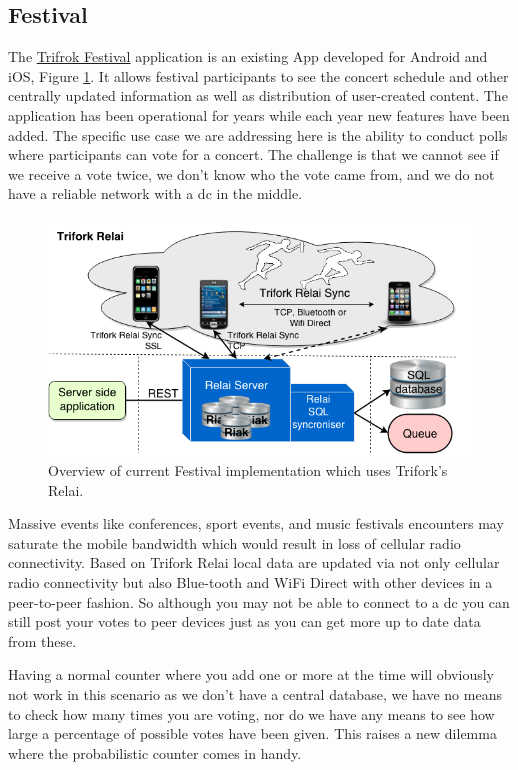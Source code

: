 \subsection{Festival}
The \href{https://www.trifork.com/news/roskilde-festival}{Trifrok Festival} application is an existing App developed for Android and iOS, Figure \ref{fig:relai_layout}. It allows festival participants to see the concert schedule and other centrally updated information as well as distribution of user-created content. The application has been operational for years while each year new features have been added. The specific use case we are addressing here is the ability to conduct polls where participants can vote for a concert. The challenge is that we cannot see if we receive a vote twice, we don't know who the vote came from, and we do not have a reliable network with a \gls{dc} in the middle.
\begin{figure}[!ht]
	\centering
	\includegraphics[width=1\textwidth]{figures/TriforkRelai.png}
	
	\caption{Overview of current Festival implementation which uses Trifork's Relai.}
	\label{fig:relai_layout}
\end{figure}

Massive events like conferences, sport events, and music festivals encounters may saturate the mobile bandwidth which would result in loss of cellular radio connectivity. Based on Trifork Relai local data are updated via not only cellular radio connectivity but also Blue-tooth and WiFi Direct with other devices in a peer-to-peer fashion. So although you may not be able to connect to a \gls{dc} you can still post your votes to peer devices just as you can get more up to date data from these.

Having a normal counter where you add one or more at the time will obviously not work in this scenario as we don't have a central database, we have no means to check how many times you are voting, nor do we have any means to see how large a percentage of possible votes have been given. This raises a new dilemma where the probabilistic counter comes in handy.


